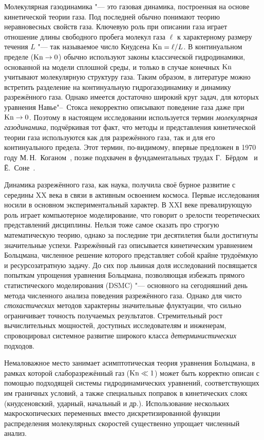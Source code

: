 Молекулярная газодинамика "--- это газовая динамика, построенная на основе кинетической теории газа.
Под последней обычно понимают теорию неравновесных свойств газа.
Ключевую роль при описании газа играет отношение длины свободного пробега молекул газа \(\ell\)
к характерному размеру течения \(L\) "--- так называемое число Кнудсена \(\mathrm{Kn}=\ell/L\).
В континуальном пределе (\(\mathrm{Kn}\to0\)) обычно используют законы классической гидродинамики,
основанной на модели сплошной среды, и только в случае конечных \(\mathrm{Kn}\)
учитывают молекулярную структуру газа. Таким образом, в литературе можно встретить
разделение на континуальную гидрогазодинамику и динамику разрежённого газа.
Однако имеется достаточно широкий круг задач, для которых уравнения Навье"--~Стокса
некорректно описывают поведение газа даже при \(\mathrm{Kn}\to0\).
Поэтому в настоящем исследовании используется термин \emph{молекулярная газодинамика},
подчёркивая тот факт, что методы и представления кинетической теории газа используются
как для разрежённого газа, так и для его континуального предела.
Этот термин, по-видимому, впервые предложен в 1970 году М.\,Н.~Коганом~\autocite{Kogan1971review},
позже подхвачен в фундаментальных трудах Г.~Бёрдом~\autocite{Bird1981} и Ё.~Соне~\autocite{Sone2007}.

{\actuality}
Динамика разрежённого газа, как наука, получила своё бурное развитие с середины XX века
в связи в активным освоением космоса. Первые исследования носили в основном экспериментальный
характер. В XXI веке превалирующую роль играет компьютерное моделирование, что
говорит о зрелости теоретических представлений дисциплины.
Нельзя тоже самое сказать про строгую математическую теорию,
однако за последние три десятилетия были достигнуты значительные успехи.
Разрежённый газ описывается кинетическим уравнением Больцмана,
численное решение которого представляет собой крайне трудоёмкую и ресурсозатратную задачу.
До сих пор львиная доля исследований посвящается попыткам упрощения уравнения Больцмана,
позволяющая избежать прямого статистического моделирования (DSMC) "--- основного
на сегодняшний день метода численного анализа поведения разрежённого газа.
Однако для чисто \emph{стохастических} методов характерны значительные флуктуации,
что сильно ограничивает точность получаемых результатов.
Стремительный рост вычислительных мощностей, доступных исследователям и инженерам,
спровоцировал системное развитие широкого класса \emph{детерминистических} подходов.

Немаловажное место занимает асимптотическая теория уравнения Больцмана,
в рамках которой слаборазрежённый газ (\(\mathrm{Kn}\ll1\)) может быть корректно описан с помощью
подходящей системы гидродинамических уравнений, соответствующих им граничных условий,
а также специальных поправок в кинетических слоях (кнудсеновский, ударный, начальный и др.).
Использование нескольких макроскопических переменных вместо дискретизированной функции распределения
молекулярных скоростей существенно упрощает численный анализ.

